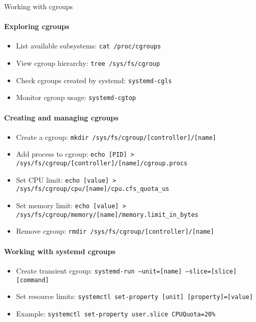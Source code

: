 \begin{KR}{Working with cgroups}\\
    \paragraph{Exploring cgroups}
    \begin{itemize}
        \item List available subsystems: \texttt{cat /proc/cgroups}
        \item View cgroup hierarchy: \texttt{tree /sys/fs/cgroup}
        \item Check cgroups created by systemd: \texttt{systemd-cgls}
        \item Monitor cgroup usage: \texttt{systemd-cgtop}
    \end{itemize}
    
    \paragraph{Creating and managing cgroups}
    \begin{itemize}
        \item Create a cgroup: \texttt{mkdir /sys/fs/cgroup/[controller]/[name]}
        \item Add process to cgroup: \texttt{echo [PID] > /sys/fs/cgroup/[controller]/[name]/cgroup.procs}
        \item Set CPU limit: \texttt{echo [value] > /sys/fs/cgroup/cpu/[name]/cpu.cfs\_quota\_us}
        \item Set memory limit: \texttt{echo [value] > /sys/fs/cgroup/memory/[name]/memory.limit\_in\_bytes}
        \item Remove cgroup: \texttt{rmdir /sys/fs/cgroup/[controller]/[name]}
    \end{itemize}
    
    \paragraph{Working with systemd cgroups}
    \begin{itemize}
        \item Create transient cgroup: \texttt{systemd-run --unit=[name] --slice=[slice] [command]}
        \item Set resource limits: \texttt{systemctl set-property [unit] [property]=[value]}
        \item Example: \texttt{systemctl set-property user.slice CPUQuota=20\%}
    \end{itemize}
\end{KR}

